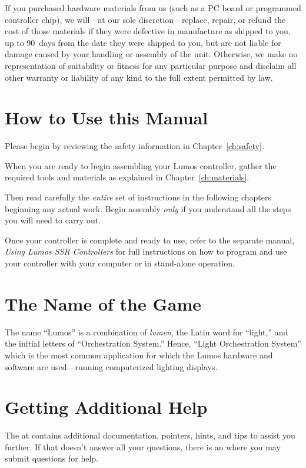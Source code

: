 \documentclass[letterpaper,twoside,onecolumn,openright,final]{memoir}
\begin{document}
If you purchased hardware materials from us (such as a PC board or programmed controller chip),
we will---at our sole discretion---replace, repair, or refund the cost of those materials if they were defective in manufacture
as shipped to you, up to 90~days from the date they were shipped to you,
but are not liable for damage caused by your handling or assembly of the unit.
Otherwise, we make no representation of suitability or fitness for any particular purpose and disclaim
all other warranty or liability of any kind to the full extent permitted by law.

\section{How to Use this Manual}
Please begin by reviewing the safety information in Chapter~\ref{ch:safety}.  

When you are ready to begin assembling your Lumos controller, gather the required tools and materials
as explained in Chapter~\ref{ch:materials}.  

Then read carefully the \emph{entire} set of instructions in the following chapters
beginning any actual work.  Begin assembly \emph{only} if you understand all the steps you will need
to carry out.

Once your controller is complete and ready to use, refer to the separate manual,
\emph{Using Lumos SSR Controllers} for full instructions on how to program
and use your controller with your computer or in stand-alone operation.

\section{The Name of the Game}
The name ``Lumos'' is a combination of \emph{lumen}, the Latin word for ``light,''
and the initial letters of ``Orchestration System.''  Hence, ``Light Orchestration System''
which is the most common application for which the Lumos hardware and software are used---running
computerized lighting displays.

\section{Getting Additional Help}
The  at  contains additional documentation,
pointers, hints, and tips to assist you further.  If that doesn't answer all your questions,
there is an  where you may submit questions for help.
\end{document}

